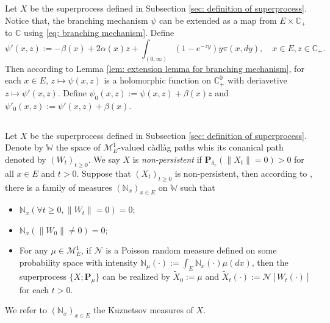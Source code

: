 \documentclass[12pt, a4paper]{amsart}
\theoremstyle{definition}
\numberwithin{equation}{section}
\begin{document}
\subsection{}
\label{sec: extension of branching mechanism}
    Let $X$ be the superprocess defined in Subsection \ref{sec: definition of superprocess}.	
	Notice that, the branching mechanism $\psi$ can be extended as a map from $E \times \mathbb C_+$ to $\mathbb C$ using \eqref{eq: branching mechanism}.
	Define
\begin{equation}
	\psi'(x,z):= - \beta(x) + 2\alpha(x) z + \int_{(0,\infty)} (1-e^{-zy})y\pi(x,dy),
	\quad x\in E, z\in \mathbb C_+.
\end{equation}
	Then according to Lemma \ref{lem: extension lemma for branching mechanism}, for each $x \in E$, $z \mapsto \psi(x,z)$ is a holomorphic function on $\mathbb C_+^0$ with deriavetive $z \mapsto \psi'(x,z)$. 
	Define $\psi_0(x,z) := \psi(x,z)+ \beta(x)z $ and $\psi'_0(x,z) := \psi'(x,z) + \beta(x)$.

\subsection{}
	Let $X$ be the superprocess defined in Subsection \ref{sec: definition of superprocess}.
	Denote by $\mathbb W$ the space of $\mathcal M_E^1$-valued c\`{a}dl\`{a}g paths whis its conanical path denoted by $(W_t)_{t\geq 0}$.
	We say $X$ is \emph{non-persistent} if $\mathbf P_{\delta_x}(\|X_t\|= 0) > 0$ for all $x\in E$ and $t> 0$.
	Suppose that $(X_t)_{t\geq 0}$ is non-persistent, then according to \cite[Section 8.4]{Li2011Measure},
	there is a family of measures $(\mathbb N_x)_{x\in E}$ on $\mathbb W$ such that
\begin{itemize}
\item
	$\mathbb N_x (\forall t \geq 0, \|W_t\|=0) =0$;
\item
	$\mathbb N_x(\|W_0 \|\neq 0) = 0$;
\item
	For any $\mu \in \mathcal M_E^1$, if $\mathcal N$ is a Poisson random measure defined on some probability space
	with intensity $\mathbb N_\mu(\cdot):= \int_E \mathbb N_x(\cdot )\mu(dx)$,
	then the superprocess $\{X;\mathbf P_\mu\}$ can be realized by $\widetilde X_0 := \mu$ and $\widetilde X_t(\cdot) := \mathcal N[W_t(\cdot)]$ for each $t>0$.
\end{itemize}
	We refer to $(\mathbb N_x)_{x\in E}$ the Kuznetsov measures of $X$.
\end{document}
